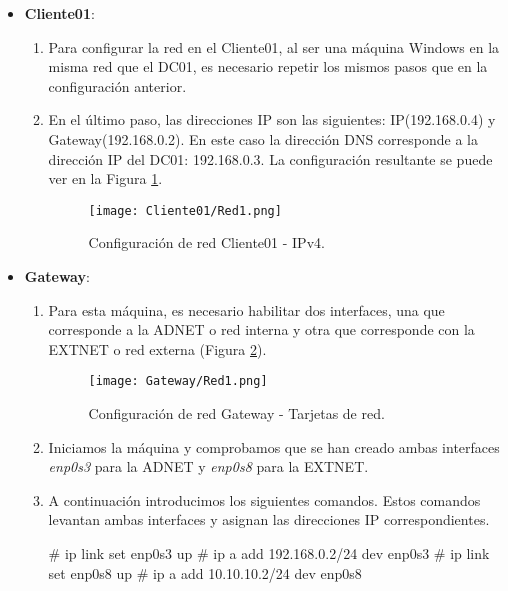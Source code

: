 \begin{itemize}
\item \textbf{Cliente01}:
\begin{enumerate}
\item Para configurar la red en el Cliente01, al ser una máquina Windows en la misma red que el DC01, es necesario repetir los mismos pasos que en la configuración anterior.
\item En el último paso, las direcciones IP son las siguientes: IP(192.168.0.4) y Gateway(192.168.0.2). En este caso la dirección DNS corresponde a la di\-re\-cción IP del DC01: 192.168.0.3. La configuración resultante se puede ver en la Figura \ref{Cliente01-Red1}.

\begin{figure}[H] %
\begin{center}
\texttt{[image: Cliente01/Red1.png]}
\end{center}
\caption{Configuración de red Cliente01 - IPv4.}
\label{Cliente01-Red1}
\end{figure}
\end{enumerate}

\item \textbf{Gateway}:

\begin{enumerate}
\item Para esta máquina, es necesario habilitar dos interfaces, una que corresponde a la ADNET o red interna y otra que corresponde con la EXTNET o red externa (Figura \ref{Gateway-Red1}).
\begin{figure}[H] %
\begin{center}
\texttt{[image: Gateway/Red1.png]}
\end{center}
\caption{Configuración de red Gateway - Tarjetas de red.}
\label{Gateway-Red1}
\end{figure}

\item Iniciamos la máquina y comprobamos que se han creado ambas interfaces {\it enp0s3} para la ADNET y {\it enp0s8} para la EXTNET. 

\item A continuación introducimos los siguientes comandos. Estos comandos levantan ambas interfaces y asignan las direcciones IP correspondientes. 
\begin{listing}[style=consola, numbers=none]
# ip link set enp0s3 up
# ip a add 192.168.0.2/24 dev enp0s3
# ip link set enp0s8 up
# ip a add 10.10.10.2/24 dev enp0s8
\end{listing}


\end{enumerate}
\end{itemize}
